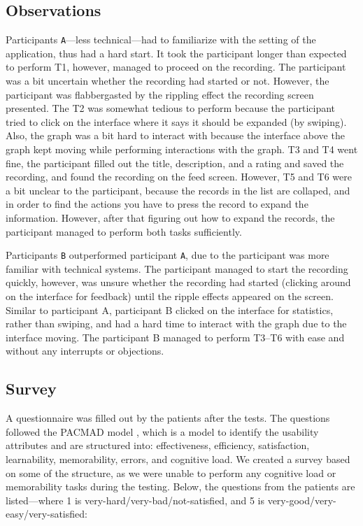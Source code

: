 \subsection{Observations}
Participants \verb|A|---less technical---had to familiarize with the setting of the application, thus had a hard start. It took the participant longer than expected to perform T1, however, managed to proceed on the recording. The participant was a bit uncertain whether the recording had started or not. However, the participant was flabbergasted by the rippling effect the recording screen presented. The T2 was somewhat tedious to perform because the participant tried to click on the interface where it says it should be expanded (by swiping). Also, the graph was a bit hard to interact with because the interface above the graph kept moving while performing interactions with the graph. T3 and T4 went fine, the participant filled out the title, description, and a rating and saved the recording, and found the recording on the feed screen. However, T5 and T6 were a bit unclear to the participant, because the records in the list are collaped, and in order to find the actions you have to press the record to expand the information. However, after that figuring out how to expand the records, the participant managed to perform both tasks sufficiently.

Participants \verb|B| outperformed participant \verb|A|, due to the participant was more familiar with technical systems. The participant managed to start the recording quickly, however, was unsure whether the recording had started (clicking around on the interface for feedback) until the ripple effects appeared on the screen. Similar to participant A, participant B clicked on the interface for statistics, rather than swiping, and had a hard time to interact with the graph due to the interface moving. The participant B managed to perform T3--T6 with ease and without any interrupts or objections. 

\subsection{Survey}
A questionnaire was filled out by the patients after the tests. The questions followed the PACMAD model \cite{pacmad}, which is a model to identify the usability attributes and are structured into: effectiveness, efficiency, satisfaction, learnability, memorability, errors, and cognitive load. We created a survey based on some of the structure, as we were unable to perform any cognitive load or memorability tasks during the testing. Below, the questions from the patients are listed---where 1 is very-hard/very-bad/not-satisfied, and 5 is very-good/very-easy/very-satisfied: 

